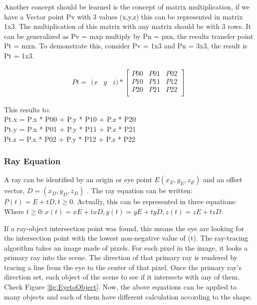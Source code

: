 \documentclass[a4paper, 12pt]{article}
\begin{document}
Another concept should be learned is the concept of matrix multiplication, if we have a Vector point Pv with 3 values (x,y,z) this can be represented in matrix 1x3. The  multiplication of this matrix with any matrix should be with 3 rows. It can be generalized as  Pv = mxp multiply by Pn = pxn, the results transfer point Pt = mxn. To demonstrate this, consider Pv = 1x3 and Pn = 3x3, the result is Pt = 1x3.

$$Pt = \begin{matrix} (x&y&z)*\left[\begin{matrix}P00&P01&P02\\P10&P11&P12\\P20&P21&P22\\\end{matrix}\right]\end{matrix}$$

This results to:\\
Pt.x = P.x * P00 + P.y * P10 + P.z * P20 \\
Pt.y = P.x * P01 + P.y * P11 + P.z * P21 \\
Pt.z = P.x * P02 + P.y * P12 + P.z * P22 \cite{Learn Computer Graphics From Scratch}

\subsubsection{Ray Equation}
A ray can be identified by an origin or eye point $E(x_E,y_E,z_E)$ and an offset vector, $D=(x_D,y_D,z_D)$ . The ray equation can be written: $P(t)=E+tD, t\geq 0$.
Actually, this can be represented in three equations: Where $ t \geq 0: x(t)=xE+txD, y(t)=yE+tyD, z(t)=zE+tzD$.

If a ray-object intersection point was found, this means the eye are looking for the intersection point with the lowest non-negative value of (t). The ray-tracing algorithm takes an image made of pixels. For each pixel in the image, it looks a primary ray into the scene. The direction of that primary ray is rendered by tracing a line from the eye to the center of that pixel. Once the primary ray's direction set, each object of the scene to see if it intersects with any of them. Check Figure \ref{fig:EyetoObject}. Now, the above equations can be applied to many objects and each of them have different calculation according to the shape.
\end{document}
